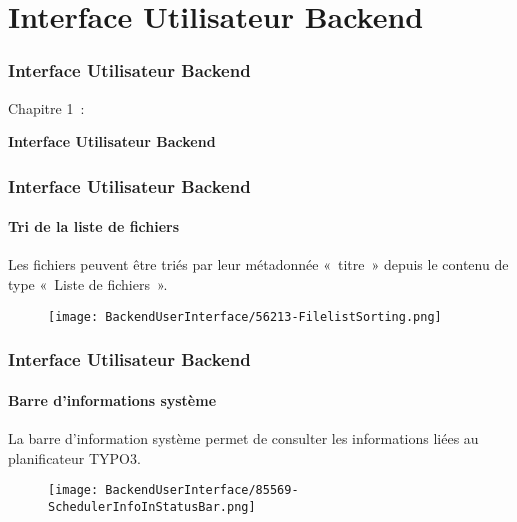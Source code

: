%

\section{Interface Utilisateur Backend}
\begin{frame}[fragile]
	\frametitle{Interface Utilisateur Backend}

	\begin{center}\huge{Chapitre 1~:}\end{center}
	\begin{center}\huge{\color{typo3darkgrey}\textbf{Interface Utilisateur Backend}}\end{center}

\end{frame}


\begin{frame}[fragile]
	\frametitle{Interface Utilisateur Backend}
	\framesubtitle{Tri de la liste de fichiers}

	Les fichiers peuvent être triés par leur métadonnée «~titre~» depuis le contenu de type
	«~Liste de fichiers~».

	\begin{figure}
		\texttt{[image: BackendUserInterface/56213-FilelistSorting.png]}
	\end{figure}

\end{frame}


\begin{frame}[fragile]
	\frametitle{Interface Utilisateur Backend}
	\framesubtitle{Barre d'informations système}

	La barre d'information système permet de consulter les informations liées au planificateur TYPO3.

	\begin{figure}
		\texttt{[image: BackendUserInterface/85569-SchedulerInfoInStatusBar.png]}
	\end{figure}

\end{frame}

